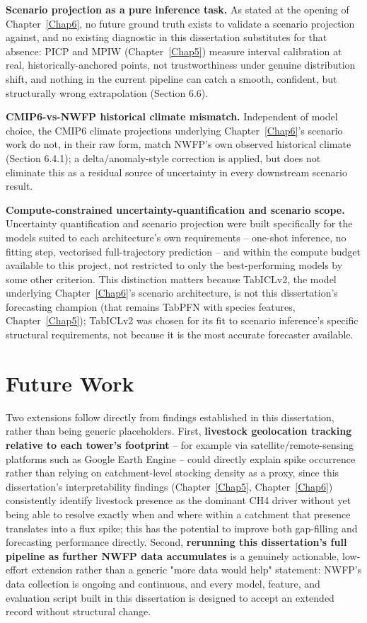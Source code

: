 \textbf{Scenario projection as a pure inference task.} As stated at the opening of
Chapter~\ref{Chap6}, no future ground truth exists to validate a scenario projection against, and no
existing diagnostic in this dissertation substitutes for that absence: PICP and MPIW
(Chapter~\ref{Chap5}) measure interval calibration at real, historically-anchored points, not
trustworthiness under genuine distribution shift, and nothing in the current pipeline can catch a
smooth, confident, but structurally wrong extrapolation (Section 6.6).

\textbf{CMIP6-vs-NWFP historical climate mismatch.} Independent of model choice, the CMIP6 climate
projections underlying Chapter~\ref{Chap6}'s scenario work do not, in their raw form, match NWFP's
own observed historical climate (Section 6.4.1); a delta/anomaly-style correction is applied, but
does not eliminate this as a residual source of uncertainty in every downstream scenario result.

\textbf{Compute-constrained uncertainty-quantification and scenario scope.} Uncertainty
quantification and scenario projection were built specifically for the models suited to each
architecture's own requirements -- one-shot inference, no fitting step, vectorised full-trajectory
prediction -- and within the compute budget available to this project, not restricted to only the
best-performing models by some other criterion. This distinction matters because TabICLv2, the model
underlying Chapter~\ref{Chap6}'s scenario architecture, is not this dissertation's forecasting
champion (that remains TabPFN with species features, Chapter~\ref{Chap5}); TabICLv2 was chosen for
its fit to scenario inference's specific structural requirements, not because it is the most
accurate forecaster available.

\section{Future Work}

Two extensions follow directly from findings established in this dissertation, rather than being
generic placeholders. First, \textbf{livestock geolocation tracking relative to each tower's
footprint} -- for example via satellite/remote-sensing platforms such as Google Earth Engine --
could directly explain spike occurrence rather than relying on catchment-level stocking density as
a proxy, since this dissertation's interpretability findings (Chapter~\ref{Chap5},
Chapter~\ref{Chap6}) consistently identify livestock presence as the dominant CH4 driver without yet
being able to resolve exactly when and where within a catchment that presence translates into a
flux spike; this has the potential to improve both gap-filling and forecasting performance directly.
Second, \textbf{rerunning this dissertation's full pipeline as further NWFP data accumulates} is a
genuinely actionable, low-effort extension rather than a generic "more data would help" statement:
NWFP's data collection is ongoing and continuous, and every model, feature, and evaluation script
built in this dissertation is designed to accept an extended record without structural change.
